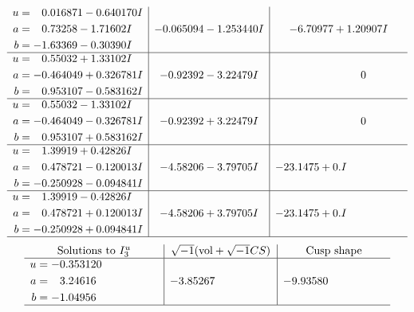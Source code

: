 \documentclass[1p]{elsarticle_modified}
\theoremstyle{definition}
\newcommand{\I}{\sqrt{-1}}
\begin{document}
$$\begin{array}{c|c|c}
\begin{aligned}
u &= \phantom{-}0.016871 - 0.640170 I \\
a &= \phantom{-}0.73258 - 1.71602 I \\
b &= -1.63369 - 0.30390 I\end{aligned}
 & -0.065094 - 1.253440 I & -6.70977 + 1.20907 I \\ \hline\begin{aligned}
u &= \phantom{-}0.55032 + 1.33102 I \\
a &= -0.464049 + 0.326781 I \\
b &= \phantom{-}0.953107 - 0.583162 I\end{aligned}
 & -0.92392 - 3.22479 I & \phantom{-0.000000 } 0 \\ \hline\begin{aligned}
u &= \phantom{-}0.55032 - 1.33102 I \\
a &= -0.464049 - 0.326781 I \\
b &= \phantom{-}0.953107 + 0.583162 I\end{aligned}
 & -0.92392 + 3.22479 I & \phantom{-0.000000 } 0 \\ \hline\begin{aligned}
u &= \phantom{-}1.39919 + 0.42826 I \\
a &= \phantom{-}0.478721 - 0.120013 I \\
b &= -0.250928 - 0.094841 I\end{aligned}
 & -4.58206 - 3.79705 I & -23.1475 + 0. I\phantom{ +0.000000I} \\ \hline\begin{aligned}
u &= \phantom{-}1.39919 - 0.42826 I \\
a &= \phantom{-}0.478721 + 0.120013 I \\
b &= -0.250928 + 0.094841 I\end{aligned}
 & -4.58206 + 3.79705 I & -23.1475 + 0. I\phantom{ +0.000000I}\\
 \hline 
 \end{array}$$\newpage$$\begin{array}{c|c|c}  
\text{Solutions to }I^u_{3}& \I (\text{vol} + \sqrt{-1}CS) & \text{Cusp shape}\\
 \hline 
\begin{aligned}
u &= -0.353120\phantom{ +0.000000I} \\
a &= \phantom{-}3.24616\phantom{ +0.000000I} \\
b &= -1.04956\phantom{ +0.000000I}\end{aligned}
 & -3.85267\phantom{ +0.000000I} & -9.93580\phantom{ +0.000000I}\\
 \hline 
 \end{array}$$\newpage
\end{document}
